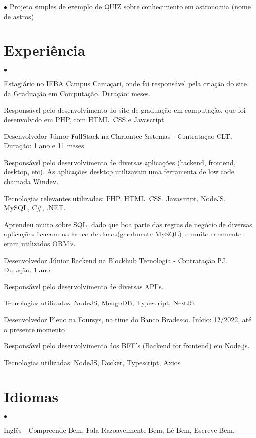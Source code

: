 \documentclass[margin,line]{res}
\newenvironment{list2}{
 \begin{list}{$\bullet$}{%
     \setlength{\itemsep}{0in}
     \setlength{\parsep}{0in} \setlength{\parskip}{0in}
     \setlength{\topsep}{0in} \setlength{\partopsep}{0in}
     \setlength{\leftmargin}{0.2in}}}{\end{list}}
\begin{document}
\begin{resume}
\begin{list2}
    Projeto simples de exemplo de QUIZ sobre conhecimento em astronomia (nome de astros)
\end{list2}
\vspace{0.2cm}
\section{Experiência}
\begin{list2}
\item Estagiário no IFBA Campus Camaçari, onde foi responsável pela criação do site da Graduação em Computação. Duração: meses.

    Responsável pelo desenvolvimento do site de graduação em computação, que foi desenvolvido em PHP, com HTML, CSS e Javascript.

\item Desenvolvedor Júnior FullStack na Clariontec Sistemas - Contratação CLT. Duração: 1 ano e 11 meses.

    Responsável pelo desenvolvimento de diversas aplicações (backend, frontend, desktop, etc). As aplicações desktop utilizavam uma ferramenta de low code chamada Windev.

    Tecnologias relevantes utilizadas: PHP, HTML, CSS, Javascript, NodeJS, MySQL, C\#, .NET.

    Aprendeu muito sobre SQL, dado que boa parte das regras de negócio de diversas aplicações ficavam no banco de dados(geralmente MySQL), e muito raramente eram utilizados ORM`s.

\item Desenvolvedor Júnior Backend na Blockhub Tecnologia - Contratação PJ. Duração: 1 ano

    Responsável pelo desenvolvimento de diversas API's.

    Tecnologias utilizadas: NodeJS, MongoDB, Typescript, NestJS.

\item Desenvolvedor Pleno na Foursys, no time do Banco Bradesco. Início: 12/2022, até o presente momento

	Responsável pelo desenvolvimento dos BFF's (Backend for frontend) em Node.js.
	
	Tecnologias utilizadas: NodeJS, Docker, Typescript, Axios
\end{list2}
\vspace{0.2cm}
\section{Idiomas}
\begin{list2}
\item Inglês - Compreende Bem, Fala Razoavelmente Bem, Lê Bem, Escreve Bem.
\end{list2}
\vspace{0.2cm}

\end{resume}
\end{document}
